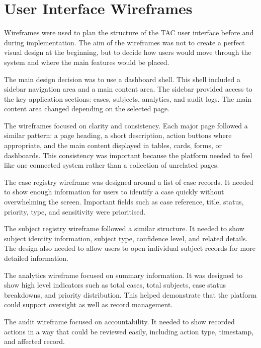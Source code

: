 \section{User Interface Wireframes}


Wireframes were used to plan the structure of the TAC user interface before and during implementation. The aim of the wireframes was not to create a perfect visual design at the beginning, but to decide how users would move through the system and where the main features would be placed.

The main design decision was to use a dashboard shell. This shell included a sidebar navigation area and a main content area. The sidebar provided access to the key application sections: cases, subjects, analytics, and audit logs. The main content area changed depending on the selected page.

The wireframes focused on clarity and consistency. Each major page followed a similar pattern: a page heading, a short description, action buttons where appropriate, and the main content displayed in tables, cards, forms, or dashboards. This consistency was important because the platform needed to feel like one connected system rather than a collection of unrelated pages.

The case registry wireframe was designed around a list of case records. It needed to show enough information for users to identify a case quickly without overwhelming the screen. Important fields such as case reference, title, status, priority, type, and sensitivity were prioritised.

The subject registry wireframe followed a similar structure. It needed to show subject identity information, subject type, confidence level, and related details. The design also needed to allow users to open individual subject records for more detailed information.

The analytics wireframe focused on summary information. It was designed to show high level indicators such as total cases, total subjects, case status breakdowns, and priority distribution. This helped demonstrate that the platform could support oversight as well as record management.

The audit wireframe focused on accountability. It needed to show recorded actions in a way that could be reviewed easily, including action type, timestamp, and affected record.


